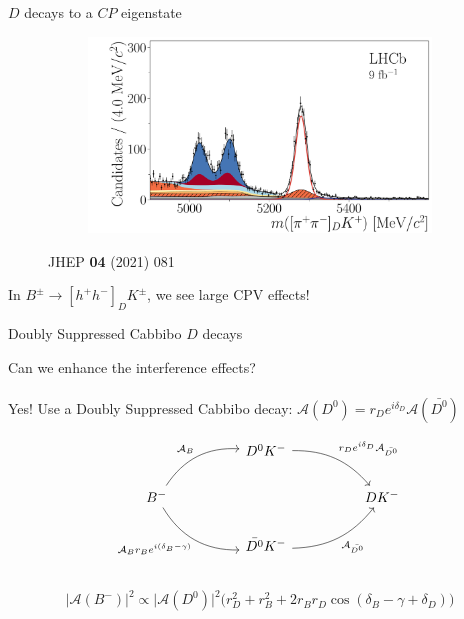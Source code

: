 \documentclass{beamer}
\begin{document}
\begin{frame}{$D$ decays to a $C\!P$ eigenstate}
\begin{figure}
\begin{subfigure}{0.45\textwidth}
    \end{subfigure}%
    \begin{subfigure}{0.45\textwidth}
      \includegraphics[width = 1.0\textwidth]{Plots/B2DK_D2pipi_Plus.pdf}
    \end{subfigure}
    \caption*{\tiny JHEP \textbf{04} (2021) 081}
  \end{figure}
  \vspace{-0.5cm}
  \begin{center}
    \Large In $B^\pm\to[h^+h^-]_DK^\pm$, we see large CPV effects!
  \end{center}
\end{frame}

\begin{frame}[fragile]{Doubly Suppressed Cabbibo $D$ decays}
  \begin{center}
    Can we enhance the interference effects?\\~\\
    Yes! Use a Doubly Suppressed Cabbibo decay: $\mathcal{A}(D^0) = r_De^{i\delta_D}\mathcal{A}(\bar{D^0})$
  \end{center}
  \begin{equation*}
    \begin{tikzcd}[column sep=huge]
      & D^0K^- \arrow[dr, bend left = 25, "r_De^{i\delta_D}\mathcal{A}_{\bar{D^0}}"] & \\
      B^- \arrow[ur, bend left, "\mathcal{A}_B"] \arrow[dr, bend right, "\mathcal{A}_B r_B e^{i(\delta_B - \gamma)}"'] & [5cm] & DK^- \\
      & \bar{D^0}K^- \arrow[ur, bend right = 25, "\mathcal{A}_{\bar{D^0}}"'] & \\
    \end{tikzcd}
  \end{equation*}
  \begin{equation*}
    \lvert\mathcal{A}(B^-)\lvert^2\propto\lvert\mathcal{A}(D^0)\lvert^2\Big(r_D^2 + r_B^2 + 2r_Br_D\cos(\delta_B - \gamma + \delta_D)\Big)
  \end{equation*}
\end{frame}
\end{document}
